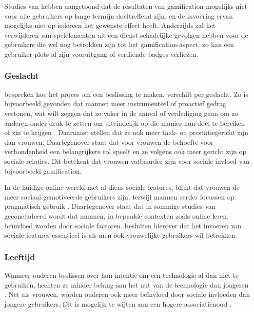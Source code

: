 Studies van \textcite{Hamari2013a} hebben aangetoond dat de resultaten van gamification mogelijks niet voor alle gebruikers op lange termijn doeltreffend zijn, en de invoering ervan mogelijks niet op iedereen het gewenste effect heeft.
Anderzijds zal het verwijderen van spelelementen uit een dienst schadelijke gevolgen hebben voor de gebruikers die wel nog betrokken zijn tot het gamification-aspect: zo kan een gebruiker plots al zijn vooruitgang of verdiende badges verliezen.

\subsubsection{Geslacht}

\textcite{Venkatesh2000} bespreken hoe het proces om een beslissing te maken, verschilt per geslacht. Zo is bijvoorbeeld gevonden dat mannen meer instrumenteel of proactief gedrag vertonen, wat wilt zeggen dat ze vaker in de aanval of verdediging gaan om zo anderen onder druk te zetten om uiteindelijk op die manier hun doel te bereiken of zin te krijgen \autocite{Spence1980}. Daarnaast stellen \textcite{Hoffman1972, Minton1980} dat ze ook meer taak- en prestatiegericht zijn dan vrouwen. Daartegenover staat dat voor vrouwen de behoefte voor verbondenheid een belangrijkere rol speelt \autocite{Hoffman1972} en ze volgens \textcite{Minton1980, Spence1980} ook meer gericht zijn op sociale relaties. Dit betekent dat vrouwen vatbaarder zijn voor sociale invloed van bijvoorbeeld gamification.

In de huidige online wereld met al diens sociale features, blijkt dat vrouwen de meer sociaal gemotiveerde gebruikers zijn, terwijl mannen eerder focussen op pragmatisch gebruik \autocite{Haferkamp2012, Muscanell2012}. Daartegenover staat dat in sommige studies van \textcite{Wang2008} geconcludeerd wordt dat mannen, in bepaalde contexten zoals online leren, beïnvloed worden door sociale factoren. \textcite{Koivisto2014} besluiten hierover dat het invoeren van sociale features essentieel is als men ook vrouwelijke gebruikers wil betrekken.

\subsubsection{Leeftijd}

Wanneer ouderen beslissen over hun intentie om een technologie al dan niet te gebruiken, hechten ze minder belang aan het nut van de technologie dan jongeren \autocite{Venkatesh2003}. Net als vrouwen, worden ouderen ook meer beïnvloed door sociale invloeden dan jongere gebruikers. Dit is mogelijk te wijten aan een hogere associatienood \autocite{Morris2000, Venkatesh2003, Wang2008}.

